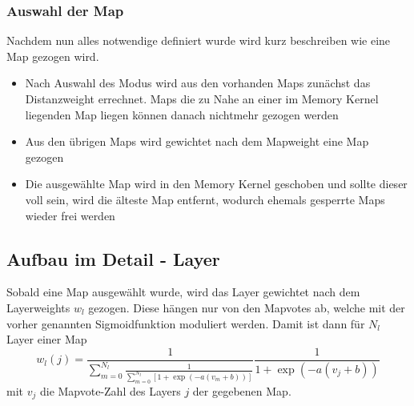         \subsubsection{Auswahl der Map}
            Nachdem nun alles notwendige definiert wurde wird kurz beschreiben wie eine Map gezogen wird.
            \begin{itemize}
                \item Nach Auswahl des Modus wird aus den vorhanden Maps zunächst das Distanzweight errechnet. Maps die zu Nahe an einer im Memory Kernel liegenden Map liegen können danach nichtmehr gezogen werden 
                \item Aus den übrigen Maps wird gewichtet nach dem Mapweight eine Map gezogen 
                \item Die ausgewählte Map wird in den Memory Kernel geschoben und sollte dieser voll sein, wird die älteste Map entfernt, wodurch ehemals gesperrte Maps wieder frei werden
            \end{itemize}
    \subsection{Aufbau im Detail - Layer}
    Sobald eine Map ausgewählt wurde, wird das Layer gewichtet nach dem Layerweights $w_l$ gezogen. 
    Diese hängen nur von den Mapvotes ab, welche mit der vorher genannten Sigmoidfunktion moduliert werden.
    Damit ist dann für $N_l$ Layer einer Map 
    \begin{equation}
        w_l(j) = \frac{1}{\sum_{m=0}^{N_l}\frac{1}{\sum_{m=0}^{N_l}\left[1+\exp\left(-a(v_m+b)\right)\right]}}\frac{1}{1+\exp\left(-a(v_j+b)\right)}
    \end{equation} 
    mit $v_j$ die Mapvote-Zahl des Layers $j$ der gegebenen Map.
